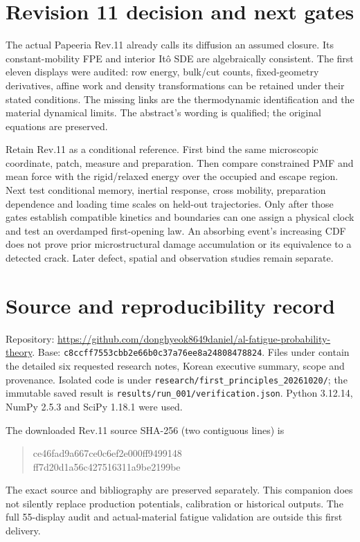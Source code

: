 \documentclass[11pt]{article}
\begin{document}
\section{Revision 11 decision and next gates}
The actual Papeeria Rev.11 already calls its diffusion an assumed closure.
Its constant-mobility FPE and interior It\^o SDE are algebraically consistent.
The first eleven displays were audited: row energy, bulk/cut counts,
fixed-geometry derivatives, affine work and density transformations can be
retained under their stated conditions. The missing links are the
thermodynamic identification and the material dynamical limits. The
abstract's wording is qualified; the original equations are preserved.

Retain Rev.11 as a conditional reference. First bind the same microscopic
coordinate, patch, measure and preparation. Then compare constrained PMF
and mean force with the rigid/relaxed energy over the occupied and escape
region. Next test conditional memory, inertial response, cross mobility,
preparation dependence and loading time scales on held-out trajectories.
Only after those gates establish compatible kinetics and boundaries can
one assign a physical clock and test an overdamped first-opening law.
An absorbing event's increasing CDF does not prove prior microstructural
damage accumulation or its equivalence to a detected crack. Later defect,
spatial and observation studies remain separate.

\appendix
\section{Source and reproducibility record}
Repository: \url{https://github.com/donghyeok8649daniel/al-fatigue-probability-theory}.
Base: \texttt{c8ccff7553cbb2e66b0c37a76ee8a24808478824}.
Files under 
contain the detailed six requested research notes, Korean executive summary,
scope and provenance. Isolated code is under
\texttt{research/first\_principles\_20261020/}; the immutable saved result is
\texttt{results/run\_001/verification.json}. Python 3.12.14, NumPy 2.5.3 and
SciPy 1.18.1 were used.

The downloaded Rev.11 source SHA-256 (two contiguous lines) is
\begin{quote}\ttfamily\small
ce46fad9a667ce0c6ef2e000ff9499148\\
ff7d20d1a56c427516311a9be2199be
\end{quote}
The exact source and bibliography are preserved separately. This companion
does not silently replace production potentials, calibration or historical
outputs. The full 55-display audit and actual-material fatigue validation
are outside this first delivery.
\end{document}
